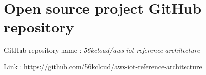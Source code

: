 

\chapter{Open source project GitHub repository} \label{repo_github}

GitHub repository name : \textit{56kcloud/aws-iot-reference-architecture}

Link : \url{https://github.com/56kcloud/aws-iot-reference-architecture}